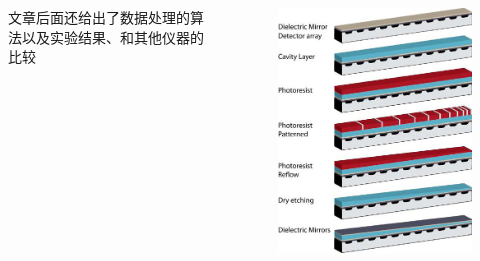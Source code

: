 \begin{frame}[c]
\begin{columns}
\begin{column}{.5\textwidth}
            文章后面还给出了数据处理的算法以及实验结果、和其他仪器的比较
        \end{column}
        \begin{column}{.5\textwidth}
            \begin{figure}[H] %
                \centering %
                \includegraphics[width=1.\textwidth]{figures/Design and implementation of a sub-nm resolution microspectrometer based on a Linear-Variable Optical Filter_2.png} %
            \end{figure}
        \end{column}
    \end{columns}
\end{frame}